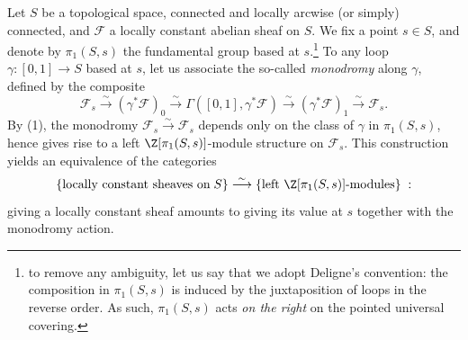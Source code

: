 \begin{para}
 Let $S$ be a topological space, connected and locally arcwise 
 (or simply) connected,
 and $\mathscr{F}$ a locally constant abelian sheaf on $S$.
 We fix a point $s\in S$, and denote by $\pi_1(S,s)$ the fundamental
 group based at $s$.\footnote{to remove any ambiguity, let us say that we
 adopt Deligne's convention: the composition in $\pi_1(S,s)$
 is induced by the juxtaposition of loops in the reverse order. As 
 such, $\pi_1(S,s)$ acts \emph{on the right} on the
 pointed universal covering.}
 To any loop $\gamma\colon [0,1]\rightarrow S$ based at $s$, let us associate
 the so-called {\it monodromy} along $\gamma$, defined by the composite
 \begin{equation*}
  \mathscr{F}_s\stackrel{\sim}{\longrightarrow}(\gamma^{\ast}\mathscr{F})_0
   \stackrel{\sim}{\longrightarrow}\Gamma([0,1],\gamma^{\ast}\mathscr{F})
   \stackrel{\sim}{\longrightarrow}(\gamma^{\ast}\mathscr{F})_1
   \stackrel{\sim}{\longrightarrow}\mathscr{F}_s.
 \end{equation*}
 By  (1), the monodromy
 $\mathscr{F}_s\xrightarrow{\sim}\mathscr{F}_s$
 depends only on the class of $\gamma$ in
 $\pi_1(S,s)$,
 hence gives rise to a left $\Z[\pi_1(S,s)]$-module structure on 
 $\mathscr{F}_s$.
 This construction yields an equivalence of the categories
 \begin{equation*}
  \left\{\textrm{locally constant sheaves on} \; S\right\}
   \stackrel{\sim}{\longrightarrow}
   \left\{\textrm{left\ }\Z[\pi_1(S,s)]\textrm{-modules}\right\}\;:
 \end{equation*}
  giving a locally constant sheaf amounts to giving its value at $s$
 together with the monodromy action.
\end{para}

%
%
